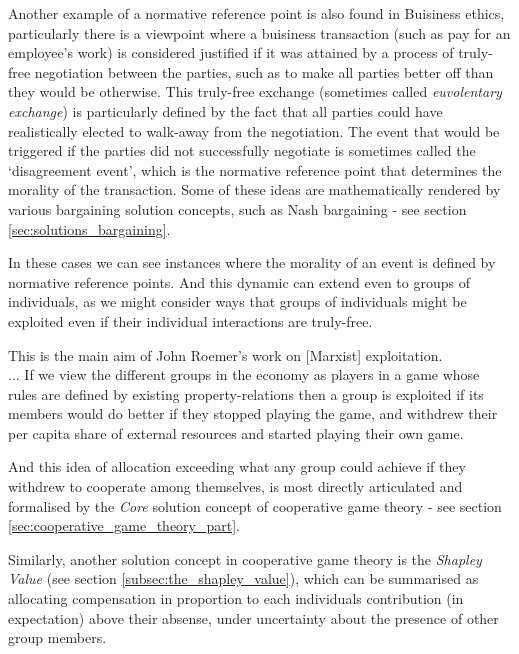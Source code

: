 Another example of a normative reference point is also found in Buisiness ethics, particularly there is a viewpoint where a buisiness transaction (such as pay for an employee's work) is considered justified if it was attained by a process of truly-free negotiation between the parties, such as to make all parties better off than they would be otherwise.\cite{ExecutiveCompensationUnjustorJustRight} 
This truly-free exchange (sometimes called \textit{euvolentary exchange}) is particularly defined by the fact that all parties could have realistically elected to walk-away from the negotiation.\cite{Guzman2019}
The event that would be triggered if the parties did not successfully negotiate is sometimes called the `disagreement event', which is the normative reference point that determines the morality of the transaction.
Some of these ideas are mathematically rendered by various bargaining solution concepts, such as Nash bargaining - see section \ref{sec:solutions_bargaining}.

In these cases we can see instances where the morality of an event is defined by normative reference points. And this dynamic can extend even to groups of individuals, as we might consider ways that groups of individuals might be exploited even if their individual interactions are truly-free.
\begin{displayquote}
This is the main aim of John Roemer's work on [Marxist] exploitation.\\... %
If we view the different groups in the economy as players in a game whose rules are defined by existing property-relations then a group is exploited if its members would do better if they stopped playing the game, and withdrew their per capita share of external resources and started playing their own game.\cite{kymlicka2002contemporary}
\end{displayquote}
And this idea of allocation exceeding what any group could achieve if they withdrew to cooperate among themselves, is most directly articulated and formalised by the \textit{Core} solution concept of cooperative game theory - see section \ref{sec:cooperative_game_theory_part}.

Similarly, another solution concept in cooperative game theory is the \textit{Shapley Value} (see section \ref{subsec:the_shapley_value}), which can be summarised as allocating compensation in proportion to each individuals contribution (in expectation) above their absense, under uncertainty about the presence of other group members.

